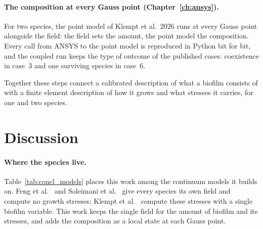\paragraph{The composition at every Gauss point (Chapter~\ref{ch:ansys}).}
For two species, the point model of Klempt et al.\ 2026 runs at every Gauss
point alongside the field: the field sets the amount, the point model the
composition. Every call from ANSYS to the point model is reproduced in Python
bit for bit, and the coupled run keeps the type of outcome of the published
cases: coexistence in case~3 and one surviving species in case~6.

Together these steps connect a calibrated description of what a biofilm
consists of with a finite element description of how it grows and what
stresses it carries, for one and two species.

\section{Discussion}
\label{sec:concl_discussion}

\paragraph{Where the species live.} Table~\ref{tab:concl_models} places this
work among the continuum models it builds on. Feng et
al.~\cite{Feng2021SymbioticBiofilm} and Soleimani et
al.~\cite{Soleimani2023CoAggregation} give every species its own field and
compute no growth stresses; Klempt et al.~\cite{Klempt2024DiffusionDrivenGrowth}
compute these stresses with a single biofilm variable. This work keeps the
single field for the amount of biofilm and its stresses, and adds the
composition as a local state at each Gauss point.

